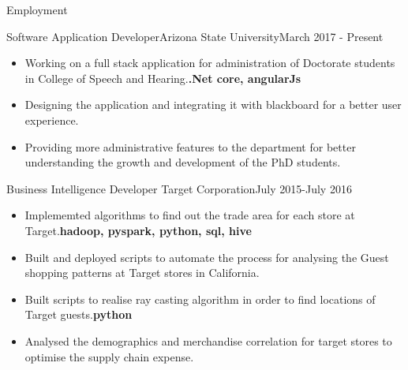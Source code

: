 \documentclass[]{nakulcv}
\begin{document}
\begin{cvsection}{Employment}
	\begin{cvsubsection}{Software Application Developer}{Arizona State University}{March 2017 - Present}
		\begin{itemize}
			\item Working on a full stack application for administration of Doctorate students in College of Speech and Hearing.\textbf{.Net core, angularJs}
			\item Designing the application and integrating it with blackboard for a better user experience.
			\item Providing more administrative features to the department for better understanding the growth and development of the PhD students.
		\end{itemize}
	\end{cvsubsection}
	\begin{cvsubsection}{Business Intelligence Developer} {Target Corporation}{July 2015-July 2016}
		\begin{itemize}
			\item Implememted algorithms to find out the trade area for each store at Target.\textbf{hadoop, pyspark, python, sql, hive}
			\item Built and deployed scripts to automate the process for analysing the Guest shopping patterns at Target stores in California.
			\item Built scripts to realise ray casting algorithm in order to find locations of Target guests.\textbf{python}
			\item Analysed the demographics and merchandise correlation for target stores to optimise the supply chain expense.
		\end{itemize}
	\end{cvsubsection}
\end{cvsection}
\end{document}
